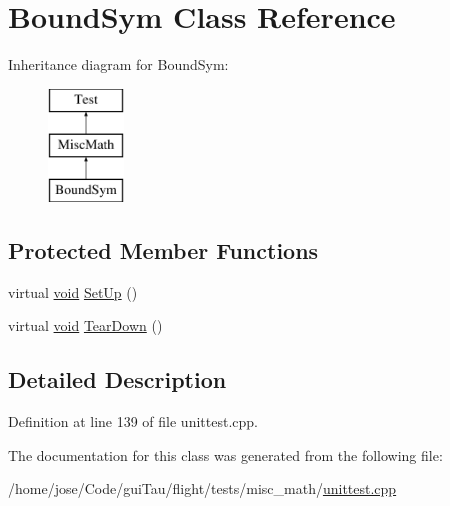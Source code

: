 \hypertarget{class_bound_sym}{\section{Bound\-Sym Class Reference}
\label{class_bound_sym}
}
Inheritance diagram for Bound\-Sym\-:\begin{figure}[H]
\begin{center}
\leavevmode
\includegraphics[height=3.000000cm]{class_bound_sym}
\end{center}
\end{figure}
\subsection*{Protected Member Functions}
\begin{DoxyCompactItemize}
\item 
virtual \hyperlink{group___n_a_m_e_ga18028b8badbf1ea7e704ccac3c488e82}{void} \hyperlink{group___unit_tests_ga3b1ffcc33db9c2489206486310736009}{Set\-Up} ()
\item 
virtual \hyperlink{group___n_a_m_e_ga18028b8badbf1ea7e704ccac3c488e82}{void} \hyperlink{group___unit_tests_gac3c27344e8473b0cfba42ddd7e28b509}{Tear\-Down} ()
\end{DoxyCompactItemize}


\subsection{Detailed Description}


Definition at line 139 of file unittest.\-cpp.



The documentation for this class was generated from the following file\-:\begin{DoxyCompactItemize}
\item 
/home/jose/\-Code/gui\-Tau/flight/tests/misc\-\_\-math/\hyperlink{misc__math_2unittest_8cpp}{unittest.\-cpp}\end{DoxyCompactItemize}
